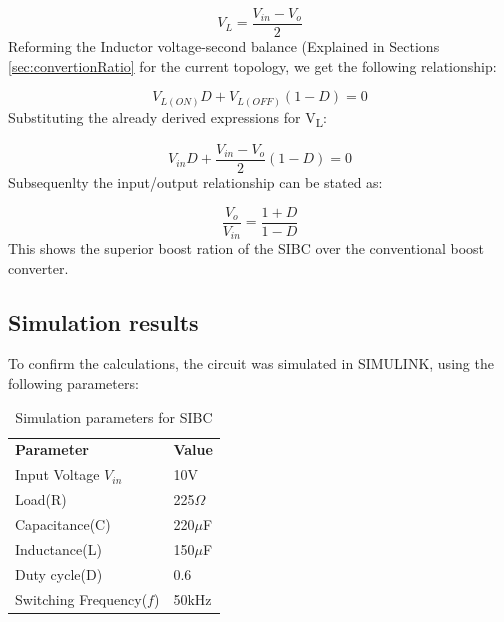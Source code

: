 \begin{equation}
	V_L=\frac{V_{in} - V_o}{2}
	\label{eq:SI_KVL_OFF2}
\end{equation}
Reforming the Inductor voltage-second balance (Explained in Sections \ref{sec:convertionRatio} for the current topology, we get the following relationship:

\begin{equation}
	V_{L(ON)}D+V_{L(OFF)}(1-D)=0
	\label{eq:SI_IVSB}
\end{equation}
Substituting the already derived expressions for V\textsubscript{L}:

\begin{equation}
	V_{in}D+\frac{V_{in} - V_o}{2}(1-D)=0
	\label{eq:SI_IVSB2}
\end{equation}
Subsequenlty the input/output relationship can be stated as:

\begin{equation}
	\frac{V_o}{V_{in}} = \frac{1+D}{1-D}
	\label{eq:SI_VO_VIN}
\end{equation}
This shows the superior boost ration of the SIBC over the conventional boost converter. 

\subsection{Simulation results}

To confirm the calculations, the circuit was simulated in SIMULINK, using the following parameters: 

\begin{table}[H]
\begin{center}
\caption {Simulation parameters for SIBC} \label{tab:SI} 
\begin{tabular}{|l|l|}
\cline{1-2}
\textbf{Parameter} & \textbf{Value}  \\ \cline{1-2}
Input Voltage $V_{in}$          &      10V   \\ \cline{1-2}
Load(R)   & 225$\Omega$           \\ \cline{1-2}
Capacitance(C)          &       220$\mu$F     \\ \cline{1-2}
Inductance(L)          &      150$\mu$F      \\ \cline{1-2}
Duty cycle(D)          &     0.6       \\ \cline{1-2}
Switching Frequency($f$)          &      50kHz      \\ \cline{1-2}
\end{tabular}
\end{center}
\end{table}

